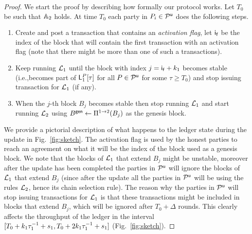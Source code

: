 \begin{proof}
We start the proof by describing how formally our protocol works.
Let $T_0$ be such that $\mathbb{A}_2$ holds. At time $T_0$ each party in $P_i\in \mathcal{P}^\mathsf{u}$ does the following steps.

\begin{enumerate}
	\item Create and post a transaction that contains an \emph{activation flag}, let $\mathsf{i_f}$ be the index of the block that will contain the first transaction with an activation flag (note that there might be more than one of such a transactions).
	\item Keep running $\mathcal{L}_1$ until the block with index  $j=\mathsf{i_f}+k_1$ becomes stable (i.e.,becomes part of $\mathsf{L}_1^{P}[\tau]$ for all $P\in\mathcal{P}^\mathsf{u}$ for some $\tau \geq T_0$) and stop issuing transaction for $\mathcal{L}_1$ (if any).
	\item When the $j$-th block $B_{j}$  becomes stable then stop running $\mathcal{L}_1$ and start running 
	$\mathcal{L}_2$ using $B^\mathsf{gen}\leftarrow\Pi^{1\rightarrow 2}(B_{j})$ as the genesis block.
	
\end{enumerate}


We provide a pictorial description of what happens to the ledger state during the update in Fig.~\ref{fig:sketch}.
The activation flag is used by the honest parties to reach an agreement on what it will be the index of the block used as a genesis block. We note that the blocks of $\mathcal{L}_1$ that extend $B_j$ might be unstable, moreover after the update has been 
completed the parties in $\mathcal{P}^\mathsf{u}$ will ignore the blocks of $\mathcal{L}_1$ that extend $B_j$ (since after the update all the parties in $\mathcal{P}^\mathsf{u}$ will be using the rules $\mathcal{L}_2$, hence its chain selection rule).  The reason why the parties in $\mathcal{P}^\mathsf{u}$ will stop issuing transactions for $\mathcal{L}_1$ is that these transactions might be included in blocks that extend $B_j$, which will be ignored after $T_0+\Delta$ rounds. This clearly affects the throughput of the ledger in the interval $[T_0+k_1 \tau_1^{-1}+s_1, T_0+2k_1 \tau_1^{-1}+s_1]$ (Fig.~\ref{fig:sketch}).


\end{proof}
